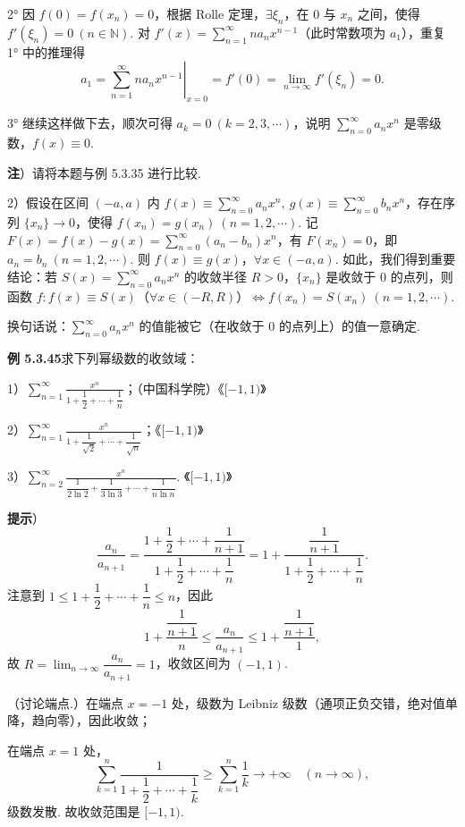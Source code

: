\documentclass[UTF8, 12pt, fontset=fandol, oneside]{ctexart}
\begin{document}
2° 因 $f(0)=f(x_n)=0$，根据 Rolle 定理，$\exists\xi_n$，在 0 与 $x_n$ 之间，使得 $f'(\xi_n)=0\ (n\in\mathbb N)$. 对 $f'(x)=\displaystyle\sum_{n=1}^{\infty}na_nx^{n-1}$（此时常数项为 $a_1$），重复 1° 中的推理得
\[
  a_1=\left.\sum_{n=1}^{\infty}na_nx^{n-1}\right|_{x=0}
  =f'(0)=\lim_{n\to\infty}f'(\xi_n)=0.
\]

3° 继续这样做下去，顺次可得 $a_k=0\ (k=2,3,\cdots)$，说明 $\displaystyle\sum_{n=0}^{\infty}a_nx^n$ 是零级数，$f(x)\equiv0$.

\noindent\textbf{注}）请将本题与例 5.3.35 进行比较.

2）假设在区间 $(-a,a)$ 内 $f(x)\equiv\displaystyle\sum_{n=0}^{\infty}a_nx^n,\ g(x)\equiv\displaystyle\sum_{n=0}^{\infty}b_nx^n$，存在序列 $\{x_n\}\to0$，使得 $f(x_n)=g(x_n)\ (n=1,2,\cdots)$. 记 $F(x)=f(x)-g(x)=\displaystyle\sum_{n=0}^{\infty}(a_n-b_n)x^n$，有 $F(x_n)=0$，即 $a_n=b_n\ (n=1,2,\cdots)$. 则 $f(x)\equiv g(x)$，$\forall x\in(-a,a)$. 如此，我们得到重要结论：若 $S(x)=\displaystyle\sum_{n=0}^{\infty}a_nx^n$ 的收敛半径 $R>0$，$\{x_n\}$ 是收敛于 0 的点列，则函数 $f:f(x)\equiv S(x)$（$\forall x\in(-R,R)$）$\Leftrightarrow f(x_n)=S(x_n)\ (n=1,2,\cdots)$.

换句话说：$\displaystyle\sum_{n=0}^{\infty}a_nx^n$ 的值能被它（在收敛于 0 的点列上）的值一意确定.

\noindent\textbf{例 5.3.45}\quad 求下列幂级数的收敛域：

1）$\displaystyle\sum_{n=1}^{\infty}
\frac{x^n}{1+\dfrac12+\cdots+\dfrac1n}$；（中国科学院）\hfill 《$[-1,1)$》

2）$\displaystyle\sum_{n=1}^{\infty}
\frac{x^n}{1+\dfrac1{\sqrt2}+\cdots+\dfrac1{\sqrt n}}$；\hfill 《$[-1,1)$》

3）$\displaystyle\sum_{n=2}^{\infty}
\frac{x^n}{\dfrac1{2\ln2}+\dfrac1{3\ln3}+\cdots+\dfrac1{n\ln n}}$. \hfill 《$[-1,1)$》

\noindent\textbf{提示}）
\[
  \frac{a_n}{a_{n+1}}
  =\frac{1+\dfrac12+\cdots+\dfrac1{n+1}}
         {1+\dfrac12+\cdots+\dfrac1n}
  =1+\frac{\dfrac1{n+1}}{1+\dfrac12+\cdots+\dfrac1n}.
\]
注意到 $1\le1+\dfrac12+\cdots+\dfrac1n\le n$，因此
\[
  1+\frac{\dfrac1{n+1}}n
  \le\frac{a_n}{a_{n+1}}
  \le1+\frac{\dfrac1{n+1}}1,
\]
故 $R=\displaystyle\lim_{n\to\infty}\dfrac{a_n}{a_{n+1}}=1$，收敛区间为 $(-1,1)$.

（讨论端点.）在端点 $x=-1$ 处，级数为 Leibniz 级数（通项正负交错，绝对值单降，趋向零），因此收敛；

在端点 $x=1$ 处，
\[
  \sum_{k=1}^n\frac1{1+\dfrac12+\cdots+\dfrac1k}
  \ge\sum_{k=1}^n\frac1k\to+\infty\quad(n\to\infty),
\]
级数发散. 故收敛范围是 $[-1,1)$.
\end{document}
